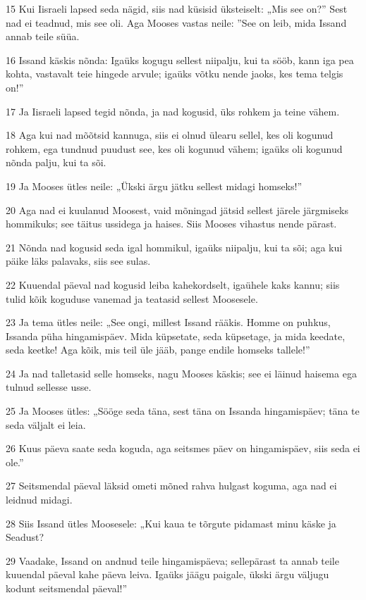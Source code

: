 \par 15 Kui Iisraeli lapsed seda nägid, siis nad küsisid üksteiselt: „Mis see on?” Sest nad ei teadnud, mis see oli. Aga Mooses vastas neile: ”See on leib, mida Issand annab teile süüa.
\par 16 Issand käskis nõnda: Igaüks kogugu sellest niipalju, kui ta sööb, kann iga pea kohta, vastavalt teie hingede arvule; igaüks võtku nende jaoks, kes tema telgis on!”
\par 17 Ja Iisraeli lapsed tegid nõnda, ja nad kogusid, üks rohkem ja teine vähem.
\par 18 Aga kui nad mõõtsid kannuga, siis ei olnud ülearu sellel, kes oli kogunud rohkem, ega tundnud puudust see, kes oli kogunud vähem; igaüks oli kogunud nõnda palju, kui ta sõi.
\par 19 Ja Mooses ütles neile: „Ükski ärgu jätku sellest midagi homseks!”
\par 20 Aga nad ei kuulanud Moosest, vaid mõningad jätsid sellest järele järgmiseks hommikuks; see täitus ussidega ja haises. Siis Mooses vihastus nende pärast.
\par 21 Nõnda nad kogusid seda igal hommikul, igaüks niipalju, kui ta sõi; aga kui päike läks palavaks, siis see sulas.
\par 22 Kuuendal päeval nad kogusid leiba kahekordselt, igaühele kaks kannu; siis tulid kõik koguduse vanemad ja teatasid sellest Moosesele.
\par 23 Ja tema ütles neile: „See ongi, millest Issand rääkis. Homme on puhkus, Issanda püha hingamispäev. Mida küpsetate, seda küpsetage, ja mida keedate, seda keetke! Aga kõik, mis teil üle jääb, pange endile homseks tallele!”
\par 24 Ja nad talletasid selle homseks, nagu Mooses käskis; see ei läinud haisema ega tulnud sellesse usse.
\par 25 Ja Mooses ütles: „Sööge seda täna, sest täna on Issanda hingamispäev; täna te seda väljalt ei leia.
\par 26 Kuus päeva saate seda koguda, aga seitsmes päev on hingamispäev, siis seda ei ole.”
\par 27 Seitsmendal päeval läksid ometi mõned rahva hulgast koguma, aga nad ei leidnud midagi.
\par 28 Siis Issand ütles Moosesele: „Kui kaua te tõrgute pidamast minu käske ja Seadust?
\par 29 Vaadake, Issand on andnud teile hingamispäeva; sellepärast ta annab teile kuuendal päeval kahe päeva leiva. Igaüks jäägu paigale, ükski ärgu väljugu kodunt seitsmendal päeval!”
